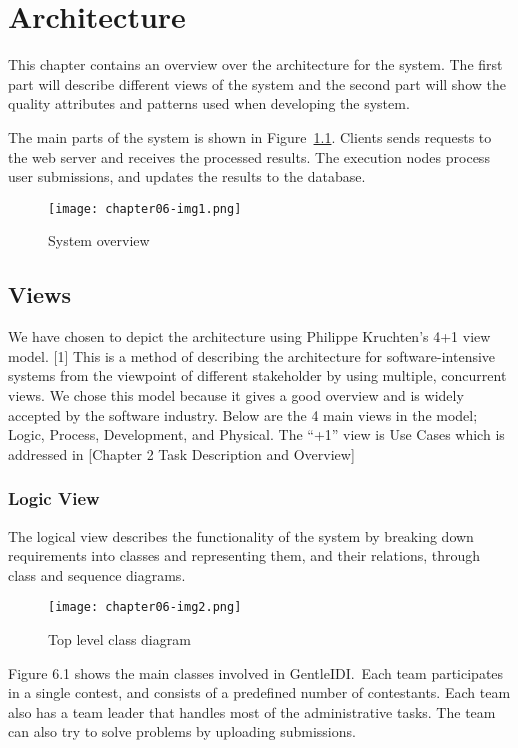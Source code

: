 
\chapter{Architecture}

This chapter contains an overview over the architecture for the system.
The first part will describe different views of the system and the
second part will show the quality attributes and patterns used when
developing the system.




The main parts of the system is shown in Figure~\ref{fig:systemOverview}. Clients sends
requests to the web server and receives the processed results. The
execution nodes process user submissions, and updates the results to
the database. 
\begin{figure}[t]
    \centering
 	\texttt{[image: chapter06-img1.png]} 
 	\caption{System overview}
 	\label{fig:systemOverview}
\end{figure}

\section{Views}

We have chosen to depict the architecture using Philippe
Kruchten's 4+1 view model. [1] This is a method of
describing the architecture for software-intensive systems from the
viewpoint of different stakeholder by using multiple, concurrent views.
We chose this model because it gives a good overview and is widely
accepted by the software industry. Below are the 4 main views in the
model; Logic, Process, Development, and Physical. The
``+1'' view is Use Cases which is
addressed in [Chapter 2 Task Description and Overview]

\subsection{Logic View}
The logical view describes the functionality of the system by breaking
down requirements into classes and representing them, and their
relations, through class and sequence diagrams.
\begin{figure}[h!]
    \centering
	\texttt{[image: chapter06-img2.png]} 
	\caption{Top level class diagram}
\end{figure}

Figure 6.1 shows the main classes involved in GentleIDI.\ Each team
participates in a single contest, and consists of a predefined number
of contestants. Each team also has a team leader that handles most of
the administrative tasks. The team can also try to solve problems by
uploading submissions. 

